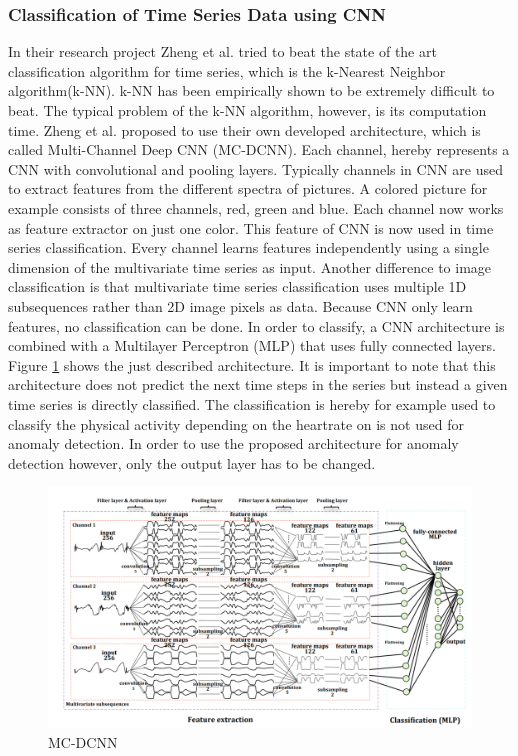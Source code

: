 \subsubsection{Classification of Time Series Data using CNN}
In their research project Zheng et al. \parencite*{Zheng2014} tried to beat the state of the art classification algorithm for time series, which is the k-Nearest Neighbor algorithm(k-NN). k-NN has been empirically shown to be extremely difficult to beat. The typical problem of the k-NN algorithm, however, is its computation time. Zheng et al. proposed to use their own developed architecture, which is called Multi-Channel Deep CNN (MC-DCNN). Each channel, hereby represents a CNN with convolutional and pooling layers.
Typically channels in CNN are used to extract features from the different spectra of pictures. A colored picture for example consists of three channels, red, green and blue. Each channel now works as feature extractor on just one color.
This feature of CNN is now used in time series classification. Every channel learns features independently using a single dimension of the multivariate time series as input. Another difference to image classification is that multivariate time series classification uses multiple 1D subsequences rather than 2D image pixels as data. Because CNN only learn features, no classification can be done. In order to classify, a CNN architecture is combined with a Multilayer Perceptron (MLP) that uses fully connected layers. Figure \ref{fig:MC-DCNN} shows the just described architecture. It is important to note that this architecture does not predict the next time steps in the series but instead a given time series is directly classified. The classification is hereby for example used to classify the physical activity depending on the heartrate on is not used for anomaly detection. In order to use the proposed architecture for anomaly detection however, only the output layer has to be changed. 

\begin{figure}[h]
	\centering
	\includegraphics[scale=0.35]{Figures/MC-DCNN}
	\decoRule
	\caption[MC-DCNN]{MC-DCNN \parencite{}}
	\label{fig:MC-DCNN}
\end{figure}

